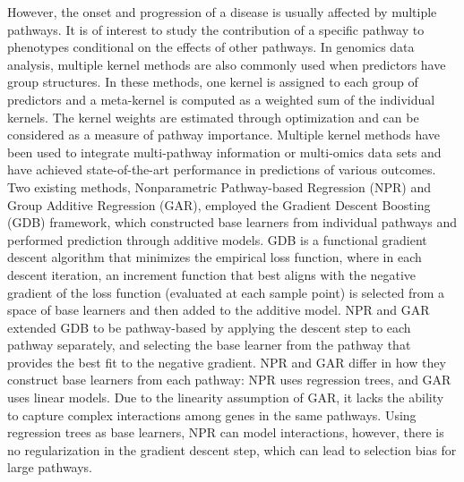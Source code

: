 \documentclass[a4paper,12pt]{article}
\begin{document}
	However, the onset and progression of a disease is usually affected by multiple pathways.\cite{shou2004mechanisms, shtivelman2014molecular, berk2009neuroprogression} It is of interest to study the contribution of a specific pathway to phenotypes conditional on the effects of other pathways. In genomics data analysis, multiple kernel methods \cite{gonen2014drug, aiolli2015easymkl} are also commonly used when predictors have group structures. In these methods, one kernel is assigned to each group of predictors and a meta-kernel is computed as a weighted sum of the individual kernels. The kernel weights are estimated through optimization and can be considered as a measure of pathway importance. Multiple kernel methods have been used to integrate multi-pathway information or multi-omics data sets and have achieved state-of-the-art performance in predictions of various outcomes.\cite{costello2014community, friedrichs2017pathway, manica2019pimkl} Two existing methods, Nonparametric Pathway-based Regression (NPR)\cite{wei2007nonparametric} and Group Additive Regression (GAR),\cite{luan2007group} employed the Gradient Descent Boosting (GDB)\cite{friedman2001greedy} framework, which constructed base learners from individual pathways and performed prediction through additive models. GDB is a functional gradient descent algorithm that minimizes the empirical loss function, where in each descent iteration, an increment function that best aligns with the negative gradient of the loss function (evaluated at each sample point) is selected from a space of base learners and then added to the additive model. NPR and GAR extended GDB to be pathway-based by applying the descent step to each pathway separately, and selecting the base learner from the pathway that provides the best fit to the negative gradient. NPR and GAR differ in how they construct base learners from each pathway: NPR uses regression trees, and GAR uses linear models. Due to the linearity assumption of GAR, it lacks the ability to capture complex interactions among genes in the same pathways. Using regression trees as base learners, NPR can model interactions, however, there is no regularization in the gradient descent step, which can lead to selection bias for large pathways.
	
\end{document}
